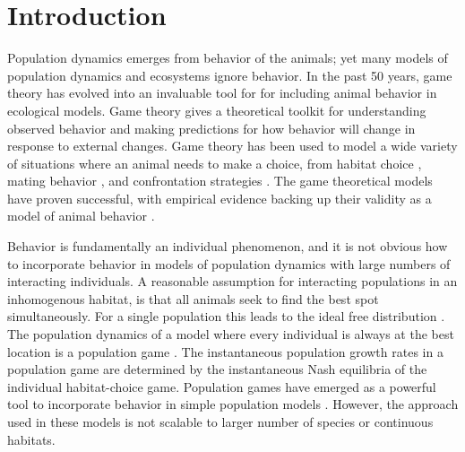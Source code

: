\section{Introduction}
Population dynamics emerges from behavior of the animals; yet many models of population dynamics and ecosystems ignore behavior.  In the past 50 years, game theory has evolved into an invaluable tool for for including animal behavior in ecological models. Game theory gives a theoretical toolkit for understanding observed behavior and making predictions for how behavior will change in response to external changes. Game theory has been used to model a wide variety of situations where an animal needs to make a choice, from habitat choice \citep{krivan1997dynamic, kondoh2003foraging,kvrivan2008ideal}, mating behavior  \citep{rapoport1967exploiter}, and confrontation strategies \citep{smith1973logic}. The game theoretical models have proven successful, with empirical evidence backing up their validity as a model of animal behavior \citep{cooper1989communication,empirical_trait,behavioral_effects}.


Behavior is fundamentally an individual phenomenon, and it is not obvious how to incorporate behavior in models of population dynamics with large numbers of interacting individuals. A reasonable assumption for interacting populations in an inhomogenous habitat, is that all animals seek to find the best spot simultaneously. For a single population this leads to the ideal free distribution \citep{fretwell1969territorial}. The population dynamics of a model where every individual is always at the best location is a population game \citep{kvrivan2009evolutionary}. The instantaneous population growth rates in a population game are determined by the instantaneous Nash equilibria of the individual habitat-choice game. Population games have emerged as a powerful tool to incorporate behavior in simple population models \citep{Krivan1998,genkai2007macrophyte, cressman2010ideal,pinti2021co, abrams2007role, gonzalez2003dynamic}. However, the approach used in these models is not scalable to larger number of species or continuous habitats.


